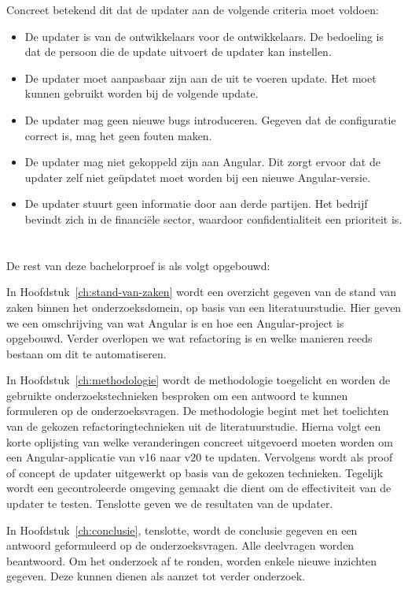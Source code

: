 Concreet betekend dit dat de updater aan de volgende criteria moet voldoen:
\begin{itemize}
  \item De updater is van de ontwikkelaars voor de ontwikkelaars. 
    De bedoeling is dat de persoon die de update uitvoert de updater kan instellen.
  \item De updater moet aanpasbaar zijn aan de uit te voeren update. 
    Het moet kunnen gebruikt worden bij de volgende update.
  \item De updater mag geen nieuwe bugs introduceren. 
    Gegeven dat de configuratie correct is, mag het geen fouten maken.
  \item De updater mag niet gekoppeld zijn aan Angular. 
    Dit zorgt ervoor dat de updater zelf niet geüpdatet moet worden bij een nieuwe Angular-versie.
  \item De updater stuurt geen informatie door aan derde partijen.
    Het bedrijf bevindt zich in de financiële sector, waardoor confidentialiteit een prioriteit is.
\end{itemize}

\section{}%
\label{sec:opzet-bachelorproef}

De rest van deze bachelorproef is als volgt opgebouwd:

In Hoofdstuk~\ref{ch:stand-van-zaken} wordt een overzicht gegeven van de stand van zaken binnen het onderzoeksdomein, op basis van een literatuurstudie.
Hier geven we een omschrijving van wat Angular is en hoe een Angular-project is opgebouwd.
Verder overlopen we wat refactoring is en welke manieren reeds bestaan om dit te automatiseren.

In Hoofdstuk~\ref{ch:methodologie} wordt de methodologie toegelicht en worden de gebruikte onderzoekstechnieken besproken om een antwoord te kunnen formuleren op de onderzoeksvragen.
De methodologie begint met het toelichten van de gekozen refactoringtechnieken uit de literatuurstudie.
Hierna volgt een korte oplijsting van welke veranderingen concreet uitgevoerd moeten worden om een Angular-applicatie van v16 naar v20 te updaten.
Vervolgens wordt als proof of concept de updater uitgewerkt op basis van de gekozen technieken.
Tegelijk wordt een gecontroleerde omgeving gemaakt die dient om de effectiviteit van de updater te testen.
Tenslotte geven we de resultaten van de updater.

In Hoofdstuk~\ref{ch:conclusie}, tenslotte, wordt de conclusie gegeven en een antwoord geformuleerd op de onderzoeksvragen.
Alle deelvragen worden beantwoord.
Om het onderzoek af te ronden, worden enkele nieuwe inzichten gegeven. 
Deze kunnen dienen als aanzet tot verder onderzoek.

